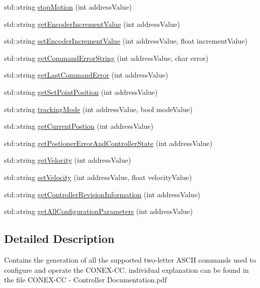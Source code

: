 \begin{DoxyCompactItemize}
\item 
std\+::string \hyperlink{namespaceconex_aa908bd9ff7a78d0b2bd7bcbe2ef7080c}{stop\+Motion} (int address\+Value)
\item 
std\+::string \hyperlink{namespaceconex_a8614267e3ba2e2c44b44bcd30bbb84b0}{get\+Encoder\+Increment\+Value} (int address\+Value)
\item 
std\+::string \hyperlink{namespaceconex_a51a2f94e8cb024ecdc120c713dd19c7c}{set\+Encoder\+Increment\+Value} (int address\+Value, float increment\+Value)
\item 
std\+::string \hyperlink{namespaceconex_a09ba026f23e2caeb631a18230bcd8b45}{get\+Command\+Error\+String} (int address\+Value, char error)
\item 
std\+::string \hyperlink{namespaceconex_a6a993799643f4e7a19f0da530e03213e}{get\+Last\+Command\+Error} (int address\+Value)
\item 
std\+::string \hyperlink{namespaceconex_a785c9ad7e52441aef38faeccf75c1e5e}{get\+Set\+Point\+Position} (int address\+Value)
\item 
std\+::string \hyperlink{namespaceconex_a231ad931cd8782bcfd30f4b60ef2e3d8}{tracking\+Mode} (int address\+Value, bool mode\+Value)
\item 
std\+::string \hyperlink{namespaceconex_abc96926292153eb7b8268a340eb140fc}{get\+Current\+Postion} (int address\+Value)
\item 
std\+::string \hyperlink{namespaceconex_ab160c5ab9d6870ec2fdf198fede98ebd}{get\+Postioner\+Error\+And\+Controller\+State} (int address\+Value)
\item 
std\+::string \hyperlink{namespaceconex_ab53c181f980eccedaa79f3b0154755df}{get\+Velocity} (int address\+Value)
\item 
std\+::string \hyperlink{namespaceconex_aa970ffa1a5a264c97b5e821e1dedf0f0}{set\+Velocity} (int address\+Value, float velocity\+Value)
\item 
std\+::string \hyperlink{namespaceconex_a0eb1fa3646288f0387cb303f0d8f71df}{get\+Controller\+Revision\+Information} (int address\+Value)
\item 
std\+::string \hyperlink{namespaceconex_a7480495275a9236b221d635dd5bc08f8}{get\+All\+Configuration\+Parameters} (int address\+Value)
\end{DoxyCompactItemize}


\subsection{Detailed Description}
Contains the generation of all the supported two-\/letter A\+S\+C\+II commands used to configure and operate the C\+O\+N\+E\+X-\/\+CC.  individual explanation can be found in the file \textquotesingle{}C\+O\+N\+E\+X-\/\+CC -\/ Controller Documentation.\+pdf\textquotesingle{} 

